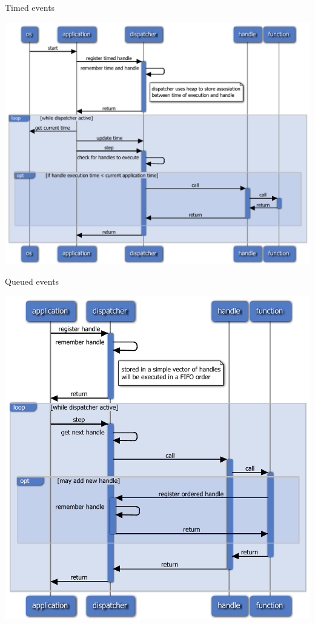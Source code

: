 \documentclass{beamer}
\begin{document}
\begin{frame}{ Timed events }
   \centerline{\includegraphics[height=0.9\textheight]{slides/timed_handles.pdf}}
\end{frame}

\begin{frame}{ Queued events }
   \centerline{\includegraphics[height=0.9\textheight]{slides/queued_handles.pdf}}
\end{frame}
\end{document}

